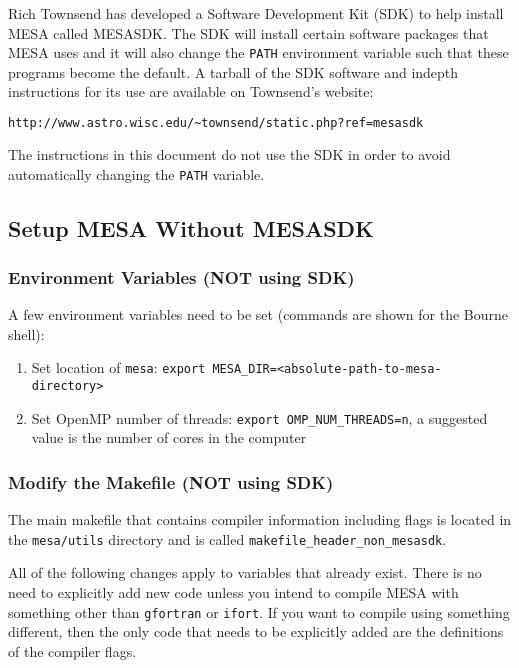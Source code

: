Rich Townsend has developed a Software Development Kit (SDK) to help install 
{\sf MESA} called {\sf MESASDK}. The SDK will install certain software 
packages that {\sf MESA} uses and it will also change the {\tt PATH} 
environment variable such that these programs become the default. A tarball 
of the SDK software and indepth instructions for its use are available on 
Townsend's website:
\begin{lstlisting}[language=html,mathescape=false]
  http://www.astro.wisc.edu/~townsend/static.php?ref=mesasdk
\end{lstlisting}
The instructions in this document do not use the SDK in order to avoid 
automatically changing the {\tt PATH} variable.

\subsection{Setup {\sf MESA} Without {\sf MESASDK}}
\label{sec:woSDK}

\subsubsection{Environment Variables (NOT using SDK)}
A few environment variables need to be set (commands are shown for the 
Bourne shell):
\begin{enumerate}
\item Set location of {\tt mesa}: 
{\tt export MESA\_DIR=<absolute-path-to-mesa-directory>}

\item Set OpenMP number of threads: {\tt export OMP\_NUM\_THREADS=n}, a 
suggested value is the number of cores in the computer
\end{enumerate}

\subsubsection{Modify the Makefile (NOT using SDK)}
The main makefile that contains compiler information including flags is 
located in the {\tt mesa/utils} directory and is called 
{\tt makefile\_header\_non\_mesasdk}. 

All of the following changes apply to 
variables that already exist. There is no need to explicitly add new code 
unless you intend to compile {\sf MESA} with something other than 
{\tt gfortran} or {\tt ifort}. If you want to compile using something 
different, then the only code that needs to be explicitly added are the 
definitions of the compiler flags. 

